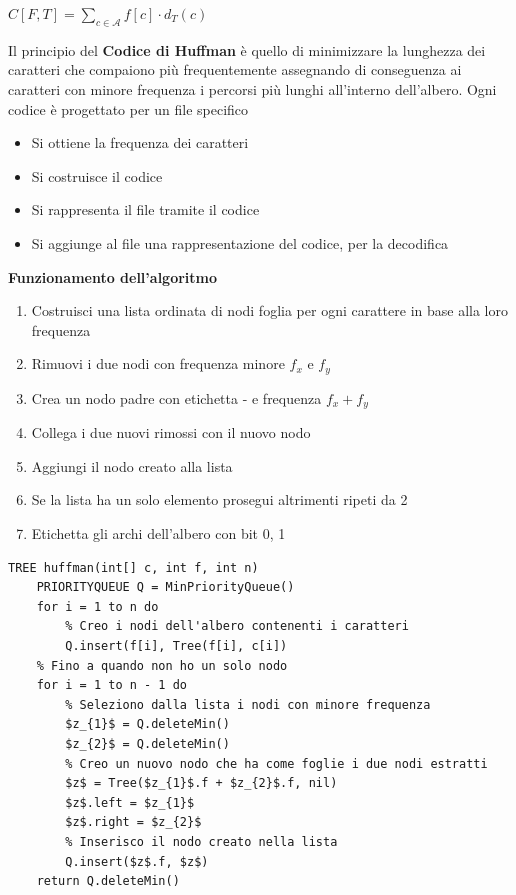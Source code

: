 \documentclass[../cheatSheetAlgoritmi.tex]{subfiles}
\begin{document}
\begin{center}
	$C[F, T] = \sum_{c \in \mathcal{A}} f[c] \cdot d_{T}(c)$
\end{center}
Il principio del \textbf{Codice di Huffman} è quello di minimizzare la lunghezza dei caratteri che compaiono più frequentemente assegnando di conseguenza ai caratteri con minore frequenza i percorsi più lunghi all'interno dell'albero. Ogni codice è progettato per un file specifico
\begin{itemize}
	\item Si ottiene la frequenza dei caratteri
	\item Si costruisce il codice
	\item Si rappresenta il file tramite il codice
	\item Si aggiunge al file una rappresentazione del codice, per la decodifica
\end{itemize}
\textbf{Funzionamento dell'algoritmo}
\begin{enumerate}
	\item Costruisci una lista ordinata di nodi foglia per ogni carattere in base alla loro frequenza
	\item Rimuovi i due nodi con frequenza minore $f_{x}$ e $f_{y}$
	\item Crea un nodo padre con etichetta - e frequenza $f_{x} + f_{y}$
	\item Collega i due nuovi rimossi con il nuovo nodo
	\item Aggiungi il nodo creato alla lista 
	\item Se la lista ha un solo elemento prosegui altrimenti ripeti da 2
	\item Etichetta gli archi dell'albero con bit 0, 1
\end{enumerate}
\begin{lstlisting}[caption=creazione albero binario di decodifica]
TREE huffman(int[] c, int f, int n)
	PRIORITYQUEUE Q = MinPriorityQueue()
	for i = 1 to n do
		% Creo i nodi dell'albero contenenti i caratteri
		Q.insert(f[i], Tree(f[i], c[i])
	% Fino a quando non ho un solo nodo
	for i = 1 to n - 1 do
		% Seleziono dalla lista i nodi con minore frequenza
		$z_{1}$ = Q.deleteMin()
		$z_{2}$ = Q.deleteMin()
		% Creo un nuovo nodo che ha come foglie i due nodi estratti
		$z$ = Tree($z_{1}$.f + $z_{2}$.f, nil)
		$z$.left = $z_{1}$
		$z$.right = $z_{2}$
		% Inserisco il nodo creato nella lista
		Q.insert($z$.f, $z$)
	return Q.deleteMin()
\end{lstlisting}
\end{document}
